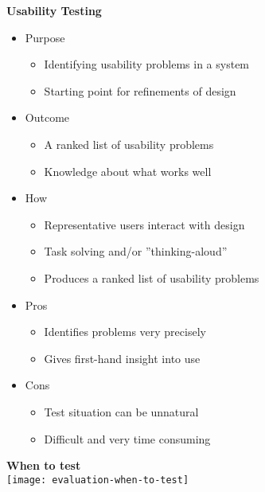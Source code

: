 \textbf{Usability Testing}
\begin{itemize}
	\item Purpose
	\begin{itemize}
		\item Identifying usability problems in a system
		\item Starting point for refinements of design
	\end{itemize}
	\item Outcome
	\begin{itemize}
		\item A ranked list of usability problems
		\item Knowledge about what works well
	\end{itemize}
	\item How
	\begin{itemize}
		\item Representative users interact with design
		\item Task solving and/or ''thinking-aloud''
		\item Produces a ranked list of usability problems 
	\end{itemize}	
	\item Pros
	\begin{itemize}
		\item Identifies problems very precisely
		\item Gives first-hand insight into use
	\end{itemize}
	\item Cons
	\begin{itemize}
		\item Test situation can be unnatural
		\item Difficult and very time consuming
	\end{itemize}
\end{itemize}

\textbf{When to test}\\
\texttt{[image: evaluation-when-to-test]}\\

